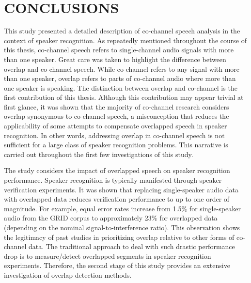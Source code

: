 \chapter{CONCLUSIONS}

This study presented a detailed description of co-channel speech analysis in the context of speaker recognition. 
As repeatedly mentioned throughout the course of this thesis, co-channel speech refers to single-channel audio signals with more than one speaker. 
Great care was taken to highlight the difference between overlap and co-channel speech. 
While co-channel refers to any signal with more than one speaker, overlap refers to parts of co-channel audio where more than one speaker is speaking. 
The distinction between overlap and co-channel is the first contribution of this thesis. 
Although this contribution may appear trivial at first glance, it was shown that the majority of co-channel research considers overlap synonymous to co-channel speech, a misconception that reduces the applicability of some attempts to compensate overlapped speech in speaker recognition. 
In other words, addressing overlap in co-channel speech is not sufficient for a large class of speaker recognition problems. 
This narrative is carried out throughout the first few investigations of this study. 

The study considers the impact of overlapped speech on speaker recognition performance. 
Speaker recognition is typically manifested through speaker verification experiments. 
It was shown that replacing single-speaker audio data with overlapped data reduces verification performance to up to one order of magnitude. 
For example, equal error rates increase from 1.5\% for single-speaker audio from the GRID corpus to approximately 23\% for overlapped data (depending on the nominal signal-to-interference ratio). 
This observation shows the legitimacy of past studies in prioritizing overlap relative to other forms of co-channel data. 
The traditional approach to deal with such drastic performance drop is to measure/detect overlapped segments in speaker recognition experiments. 
Therefore, the second stage of this study provides an extensive investigation of overlap detection methods. 

